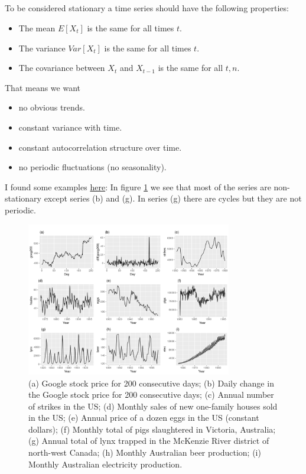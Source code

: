 \documentclass[]{article}
\begin{document}
	\subsection{}
	To be considered stationary a time series should have the following properties:
	\begin{itemize}
		\item The mean $E[X_t]$ is the same for all times $t$.
		\item The variance $Var[X_t]$ is the same for all times $t$.
		\item The covariance between $X_t$ and $X_{t-1}$ is the same for all $t, n$.
	\end{itemize}
	That means we want
	\begin{itemize}
		\item no obvious trends.
		\item constant variance with time.
		\item constant autocorrelation structure over time.
		\item no periodic fluctuations (no seasonality).
	\end{itemize}
	I found some examples \href{https://otexts.com/fpp2/stationarity.html}{here}: In figure \ref{fig:time_series} we see that most of the series are non-stationary except series (b) and (g). In series (g) there are cycles but they are not periodic. 
	\begin{figure}
		\centering
		\includegraphics[width=0.8\textwidth]{images/time_series.png}
		\caption{(a) Google stock price for 200 consecutive days; (b) Daily change in the Google stock price for 200 consecutive days; (c) Annual number of strikes in the US; (d) Monthly sales of new one-family houses sold in the US; (e) Annual price of a dozen eggs in the US (constant dollars); (f) Monthly total of pigs slaughtered in Victoria, Australia; (g) Annual total of lynx trapped in the McKenzie River district of north-west Canada; (h) Monthly Australian beer production; (i) Monthly Australian electricity production.}
		\label{fig:time_series}
	\end{figure}
	
\end{document}
